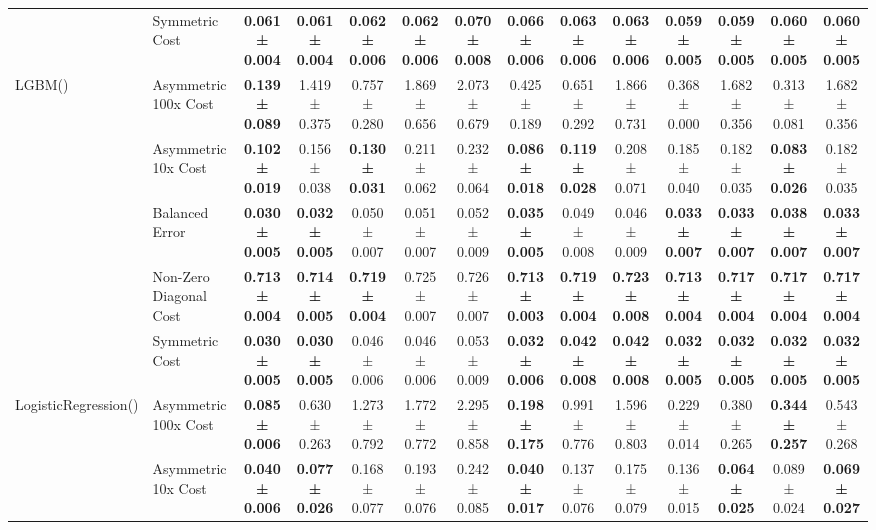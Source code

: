 \begin{table}[H]
{\begin{tabular}{llcccccccccccc}
 & Symmetric Cost & \textbf{0.061 ± 0.004} & \textbf{0.061 ± 0.004} & \textbf{0.062 ± 0.006} & \textbf{0.062 ± 0.006} & \textbf{0.070 ± 0.008} & \textbf{0.066 ± 0.006} & \textbf{0.063 ± 0.006} & \textbf{0.063 ± 0.006} & \textbf{0.059 ± 0.005} & \textbf{0.059 ± 0.005} & \textbf{0.060 ± 0.005} & \textbf{0.060 ± 0.005} \\
\cline{1-14}
\multirow[t]{5}{*}{LGBM()} & Asymmetric 100x Cost & \textbf{0.139 ± 0.089} & 1.419 ± 0.375 & 0.757 ± 0.280 & 1.869 ± 0.656 & 2.073 ± 0.679 & 0.425 ± 0.189 & 0.651 ± 0.292 & 1.866 ± 0.731 & 0.368 ± 0.000 & 1.682 ± 0.356 & 0.313 ± 0.081 & 1.682 ± 0.356 \\
 & Asymmetric 10x Cost & \textbf{0.102 ± 0.019} & 0.156 ± 0.038 & \textbf{0.130 ± 0.031} & 0.211 ± 0.062 & 0.232 ± 0.064 & \textbf{0.086 ± 0.018} & \textbf{0.119 ± 0.028} & 0.208 ± 0.071 & 0.185 ± 0.040 & 0.182 ± 0.035 & \textbf{0.083 ± 0.026} & 0.182 ± 0.035 \\
 & Balanced Error & \textbf{0.030 ± 0.005} & \textbf{0.032 ± 0.005} & 0.050 ± 0.007 & 0.051 ± 0.007 & 0.052 ± 0.009 & \textbf{0.035 ± 0.005} & 0.049 ± 0.008 & 0.046 ± 0.009 & \textbf{0.033 ± 0.007} & \textbf{0.033 ± 0.007} & \textbf{0.038 ± 0.007} & \textbf{0.033 ± 0.007} \\
 & Non-Zero Diagonal Cost & \textbf{0.713 ± 0.004} & \textbf{0.714 ± 0.005} & \textbf{0.719 ± 0.004} & 0.725 ± 0.007 & 0.726 ± 0.007 & \textbf{0.713 ± 0.003} & \textbf{0.719 ± 0.004} & \textbf{0.723 ± 0.008} & \textbf{0.713 ± 0.004} & \textbf{0.717 ± 0.004} & \textbf{0.717 ± 0.004} & \textbf{0.717 ± 0.004} \\
 & Symmetric Cost & \textbf{0.030 ± 0.005} & \textbf{0.030 ± 0.005} & 0.046 ± 0.006 & 0.046 ± 0.006 & 0.053 ± 0.009 & \textbf{0.032 ± 0.006} & \textbf{0.042 ± 0.008} & \textbf{0.042 ± 0.008} & \textbf{0.032 ± 0.005} & \textbf{0.032 ± 0.005} & \textbf{0.032 ± 0.005} & \textbf{0.032 ± 0.005} \\
\cline{1-14}
\multirow[t]{5}{*}{LogisticRegression()} & Asymmetric 100x Cost & \textbf{0.085 ± 0.006} & 0.630 ± 0.263 & 1.273 ± 0.792 & 1.772 ± 0.772 & 2.295 ± 0.858 & \textbf{0.198 ± 0.175} & 0.991 ± 0.776 & 1.596 ± 0.803 & 0.229 ± 0.014 & 0.380 ± 0.265 & \textbf{0.344 ± 0.257} & 0.543 ± 0.268 \\
 & Asymmetric 10x Cost & \textbf{0.040 ± 0.006} & \textbf{0.077 ± 0.026} & 0.168 ± 0.077 & 0.193 ± 0.076 & 0.242 ± 0.085 & \textbf{0.040 ± 0.017} & 0.137 ± 0.076 & 0.175 ± 0.079 & 0.136 ± 0.015 & \textbf{0.064 ± 0.025} & 0.089 ± 0.024 & \textbf{0.069 ± 0.027} \\

\end{tabular}}
\end{table}
